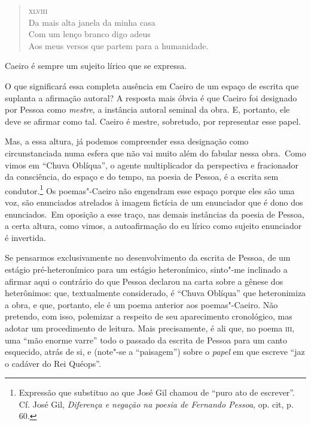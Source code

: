 \begin{verse}
\textsc{xlviii}\\[5pt]
Da mais alta janela da minha casa\\
Com um lenço branco digo adeus\\
Aos meus versos que partem para a \qb{}humanidade.
\end{verse}

Caeiro é sempre um sujeito lírico que se expressa.

O que significará essa completa ausência em Caeiro de um espaço de
escrita que suplanta a afirmação autoral? A resposta mais óbvia é que
Caeiro foi designado por Pessoa como \emph{mestre}, a instância autoral
seminal da obra. E, portanto, ele deve se afirmar como tal. Caeiro é
mestre, sobretudo, por representar esse papel.

Mas, a essa altura, já podemos compreender essa designação como
circunstanciada numa esfera que não vai muito além do fabular nessa
obra.~Como vimos em ``Chuva Oblíqua'', o agente multiplicador da
perspectiva e fracionador da consciência, do espaço e do tempo, na
poesia de Pessoa, é a escrita sem condutor.\footnote{Expressão que
  substituo ao que José Gil chamou de ``puro ato de escrever''. Cf. José
  Gil, \emph{Diferença e negação na poesia de Fernando Pessoa}, op. cit,
  p. 60.} Os poemas"-Caeiro não engendram esse espaço porque eles são uma
voz, são enunciados atrelados à imagem fictícia de um enunciador que é
dono dos enunciados.~Em oposição a esse traço, nas demais instâncias da
poesia de Pessoa, a certa altura, como vimos, a autoafirmação do eu
lírico como sujeito enunciador é invertida.

Se pensarmos exclusivamente no desenvolvimento da escrita de Pessoa, de
um estágio pré-heteronímico para um estágio heteronímico, sinto"-me
inclinado a afirmar aqui o contrário do que Pessoa declarou na carta
sobre a gênese dos heterônimos: que, textualmente considerado, é ``Chuva
Oblíqua'' que heteronimiza a obra, e que, portanto, ele é um poema
anterior aos poemas"-Caeiro. Não pretendo, com isso, polemizar a respeito
de seu aparecimento cronológico, mas adotar um procedimento de leitura.
Mais precisamente, é ali que, no poema \textsc{iii}, uma ``mão enorme
varre'' todo o passado da escrita de Pessoa para um canto esquecido,
atrás de si, e (note"-se a ``paisagem'') sobre o \emph{papel} em que
escreve ``jaz o cadáver do Rei Quéops''.

